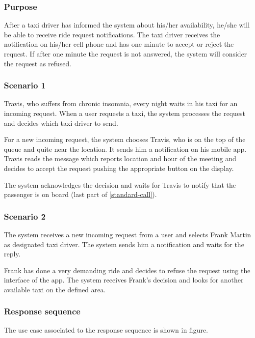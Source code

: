 \label{driver-notification}
\subsubsection{Purpose}

After a taxi driver has informed the system about his/her availability, %
he/she will be able to receive ride request notifications. The taxi driver receives the notification on his/her cell phone and has one minute to accept or reject the request. If after one minute the request is not answered, the system will consider the request as refused.

\subsubsection{Scenario 1}
Travis, who suffers from chronic insomnia, every night waits in his taxi for an incoming request. When a user requests a taxi, the system processes the request and decides which taxi driver to send. 

For a new incoming request, the system chooses Travis, who is on the top of the queue and quite near the location. It sends him a notification on his mobile app. Travis reads the message which reports location and hour of the meeting and decides to accept the request pushing the appropriate button on the display.

The system acknowledges the decision and waits for Travis to notify that the passenger is on board (last part of \ref{standard-call}).

\subsubsection{Scenario 2}
The system receives a new incoming request from a user and selects Frank Martin as designated taxi driver. %
The system sends him a notification and waits for the reply.

Frank has done a very demanding ride and decides to refuse the request using the interface of the app. The system receives Frank's decision and looks for another available taxi on the defined area.

\subsubsection{Response sequence}
The use case associated to the response sequence is shown in figure.

